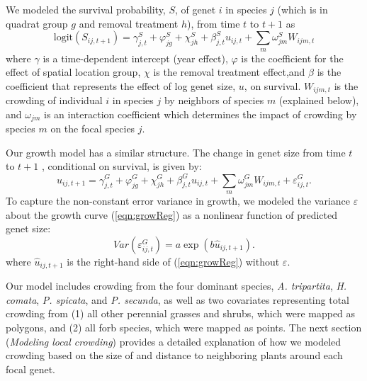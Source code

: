 \documentclass[11pt]{article}
\begin{document}
We modeled the survival probability, $S$, of genet $i$ in species $j$ (which is in quadrat group $g$ and removal treatment $h$), 
from time $t$ to $t+1$  as
\begin{equation}
\mbox{logit}(S_{ij,t+1}) = \gamma_{j,t}^S + \varphi_{jg}^S+  \chi_{jh}^S  + \beta_{j,t}^S u_{ij,t} +  
\sum \limits_{m} \omega_{jm}^S {W}_{ijm,t}
\label{eqn:survReg}
\end{equation}
where $\gamma$ is a time-dependent intercept (year effect), $\varphi$ is the coefficient for the 
effect of spatial location group, $\chi$ is the removal treatment effect,and  $\beta$ is the coefficient that 
represents the effect of log genet size, $u$, on survival. 
$W_{ijm,t}$ is the crowding of individual $i$ in species $j$ by neighbors of species $m$ (explained below), and 
$\omega_{jm}$ is an interaction coefficient which determines the impact of crowding by species $m$ on the focal species $j$. 

Our growth model has a similar structure. The change in genet size from time $t$ to $t+1$ , conditional on survival, is given by:
\begin{equation}
u_{ij,t+1} = \gamma_{j,t}^G + \varphi_{jg}^G+  \chi_{jh}^G  + \beta_{j,t}^G u_{ij,t} + 
\sum \limits_{m} \omega_{jm}^G {W}_{ijm,t} + \varepsilon_{ij,t}^G .
\label{eqn:growReg}
\end{equation}
To capture the non-constant error variance in growth, we modeled the variance $\varepsilon$ about the growth 
curve (\ref{eqn:growReg}) as a nonlinear function of predicted genet size:
\begin{equation}
Var(\varepsilon_{ij,t}^G) = a \exp(b\hat{u}_{ij,t+1}).
\label{eqn:growVar}
\end{equation}
where $\hat{u}_{ij,t+1}$ is the right-hand side of (\ref{eqn:growReg}) without $\varepsilon$. 

Our model includes crowding from the four dominant species, \textit{A. tripartita}, \textit{H. comata}, \textit{P. spicata}, and \textit{P. secunda}, as well as two covariates representing total crowding from (1) all other perennial grasses and shrubs, which were mapped as polygons, and (2) all forb species, which were mapped as points. The next section (\textit{Modeling local crowding}) provides a detailed explanation of how we modeled crowding based on the size of and distance to neighboring plants around each focal genet.
\end{document}
